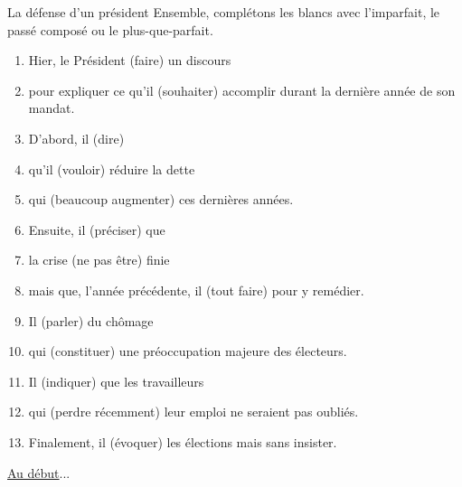 \begin{frame}{La défense d'un président}
  \scriptsize
  Ensemble, complétons les blancs avec l'\alert{imparfait}, le \alert{passé composé} ou le \alert{plus-que-parfait}.
  \begin{enumerate}
    \item Hier, le Président \underline{} (faire) un discours
    \item pour expliquer ce qu'il \underline{} (souhaiter) accomplir durant la dernière année de son mandat.
    \item D'abord, il \underline{} (dire)
    \item qu'il \underline{} (vouloir) réduire la dette
    \item qui \underline{} (beaucoup augmenter) ces dernières années.
    \item Ensuite, il \underline{} (préciser) que
    \item la crise \underline{} (ne pas être) finie
    \item mais que, l'année précédente, il \underline{} (tout faire) pour y remédier.
    \item Il \underline{} (parler) du chômage
    \item qui \underline{} (constituer) une préoccupation majeure des électeurs.
    \item Il \underline{} (indiquer) que les travailleurs
    \item qui \underline{} (perdre récemment) leur emploi ne seraient pas oubliés.
    \item Finalement, il \underline{} (évoquer) les élections mais sans insister.
  \end{enumerate}
  \raggedleft
  \hyperlink{début}{Au début}...
\end{frame}